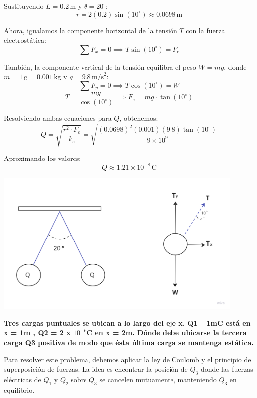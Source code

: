 \documentclass[answers]{exam} %
\begin{document}
\begin{questions}
\begin{multicols}{2}
		Sustituyendo \( L = 0.2 \, \text{m} \) y \( \theta = 20^\circ \):
		\[
			r = 2(0.2) \sin\left(10^\circ\right) \approx 0.0698 \, \text{m}
		\]

		Ahora, igualamos la componente horizontal de la tensión \( T \) con la fuerza electrostática:
		\[
			\sum F_x = 0  \implies T \sin\left(10^\circ\right) = F_e
		\]

		También, la componente vertical de la tensión equilibra el peso \( W = mg \), donde \( m = 1 \, \text{g} = 0.001 \, \text{kg} \) y \( g = 9.8 \, \text{m/s}^2 \):
		\[
			\sum F_y = 0  \implies T \cos\left(10^\circ\right) = W
		\]
		\[
			T  = \dfrac{mg}{\cos\left(10^\circ\right)} \implies F_e = mg\cdot \tan\left(10^\circ\right)
		\]

		Resolviendo ambas ecuaciones para \( Q \), obtenemos:
		\[
			Q = \sqrt{\frac{r^2 \cdot F_e}{k_e}} = \sqrt{\frac{(0.0698)^2 (0.001)(9.8) \tan(10^\circ)}{9 \times 10^9}}
		\]

		Aproximando los valores:
		\[
			Q \approx 1.21 \times 10^{-8} \, \text{C}
		\]
	\end{multicols}


	\begin{minipage}{\textwidth}
		\centering
		\includegraphics[width=0.9\textwidth]{public/g3.png}\\
	\end{minipage}

	\vspace{0.5cm}
	\newpage

	\question \large\textbf{Tres cargas puntuales se ubican a lo largo del eje x. Q1= 1mC está en x = 1m ,  Q2 = 2 x $10^{-6}$C en x = 2m. Dónde debe ubicarse la tercera carga Q3 positiva de modo que
		ésta última carga se mantenga estática.}

	\begin{multicols}{2} %
		Para resolver este problema, debemos aplicar la ley de Coulomb y el principio de superposición de fuerzas. La idea es encontrar la posición de \( Q_3 \) donde las fuerzas eléctricas de \( Q_1 \) y \( Q_2 \) sobre \( Q_3 \) se cancelen mutuamente, manteniendo \( Q_3 \) en equilibrio.


\end{multicols}
\end{questions}
\end{document}
